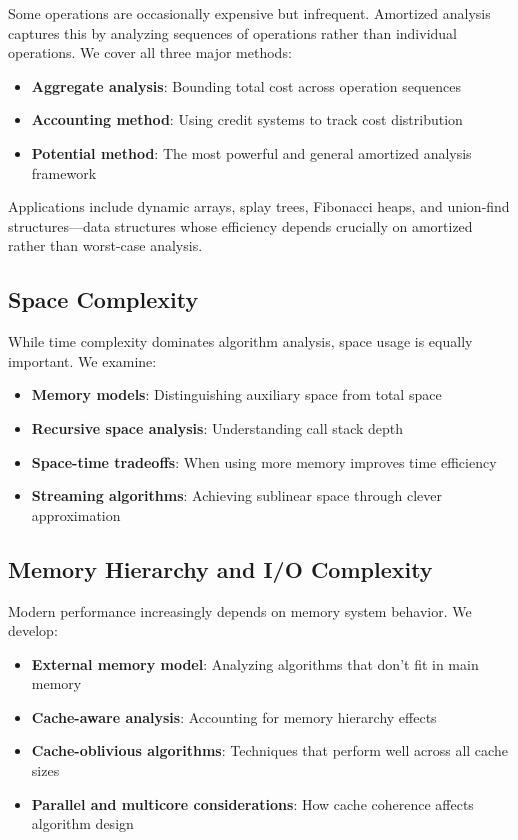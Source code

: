 Some operations are occasionally expensive but infrequent. Amortized analysis captures this by analyzing sequences of operations rather than individual operations. We cover all three major methods:

\begin{itemize}
    \item \textbf{Aggregate analysis}: Bounding total cost across operation sequences
    \item \textbf{Accounting method}: Using credit systems to track cost distribution
    \item \textbf{Potential method}: The most powerful and general amortized analysis framework
\end{itemize}
Applications include dynamic arrays, splay trees, Fibonacci heaps, and union-find structures—data structures whose efficiency depends crucially on amortized rather than worst-case analysis.

\subsection{Space Complexity}

While time complexity dominates algorithm analysis, space usage is equally important. We examine:

\begin{itemize}
    \item \textbf{Memory models}: Distinguishing auxiliary space from total space
    \item \textbf{Recursive space analysis}: Understanding call stack depth
    \item \textbf{Space-time tradeoffs}: When using more memory improves time efficiency
    \item \textbf{Streaming algorithms}: Achieving sublinear space through clever approximation
\end{itemize}

\subsection{Memory Hierarchy and I/O Complexity}

Modern performance increasingly depends on memory system behavior. We develop:

\begin{itemize}
    \item \textbf{External memory model}: Analyzing algorithms that don't fit in main memory
    \item \textbf{Cache-aware analysis}: Accounting for memory hierarchy effects
    \item \textbf{Cache-oblivious algorithms}: Techniques that perform well across all cache sizes
    \item \textbf{Parallel and multicore considerations}: How cache coherence affects algorithm design
\end{itemize}

